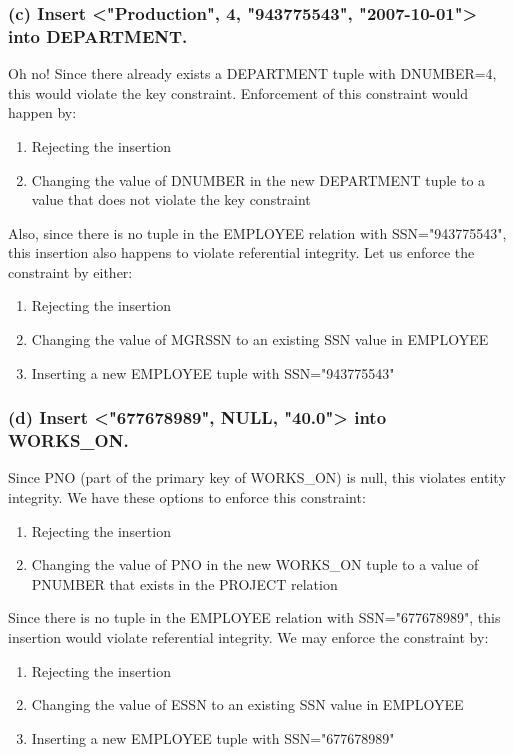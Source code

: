 \subsubsection*{(c) Insert <"Production", 4, "943775543", "2007-10-01"> into DEPARTMENT.}
Oh no! Since there already exists a DEPARTMENT tuple with DNUMBER=4, this would violate the key constraint. Enforcement of this constraint would happen by:
\begin{enumerate}
\item Rejecting the insertion
\item Changing the value of DNUMBER in the new DEPARTMENT tuple to a value that does not violate the key constraint
\end{enumerate}
Also, since there is no tuple in the EMPLOYEE relation with SSN="943775543", this insertion also happens to violate referential integrity. Let us enforce the constraint by either: 
\begin{enumerate}
\item Rejecting the insertion
\item Changing the value of MGRSSN to an existing SSN value in EMPLOYEE
\item Inserting a new EMPLOYEE tuple with SSN="943775543"
\end{enumerate}

\subsubsection*{(d) Insert <"677678989", NULL, "40.0"> into WORKS\_ON.}
Since PNO (part of the primary key of WORKS\_ON) is null, this violates entity integrity. We have these options to enforce this constraint:
\begin{enumerate}
\item Rejecting the insertion
\item Changing the value of PNO in the new WORKS\_ON tuple to a value of PNUMBER that exists in the PROJECT relation
\end{enumerate}
Since there is no tuple in the EMPLOYEE relation with SSN="677678989", this insertion would violate referential integrity. We may enforce the constraint by:
\begin{enumerate}
\item Rejecting the insertion
\item Changing the value of ESSN to an existing SSN value in EMPLOYEE
\item Inserting a new EMPLOYEE tuple with SSN="677678989"
\end{enumerate}

